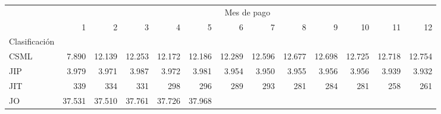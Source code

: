 \begin{tabular}{lllllllllllll}
\cline{1-13}
\multicolumn{1}{c}{} &
  \multicolumn{12}{|c}{Mes de pago} \\
\multicolumn{1}{c}{} &
  \multicolumn{1}{|r}{1} &
  \multicolumn{1}{r}{2} &
  \multicolumn{1}{r}{3} &
  \multicolumn{1}{r}{4} &
  \multicolumn{1}{r}{5} &
  \multicolumn{1}{r}{6} &
  \multicolumn{1}{r}{7} &
  \multicolumn{1}{r}{8} &
  \multicolumn{1}{r}{9} &
  \multicolumn{1}{r}{10} &
  \multicolumn{1}{r}{11} &
  \multicolumn{1}{r}{12} \\
\cline{1-13}
\multicolumn{1}{l}{Clasificación} &
  \multicolumn{1}{|r}{} &
  \multicolumn{1}{r}{} &
  \multicolumn{1}{r}{} &
  \multicolumn{1}{r}{} &
  \multicolumn{1}{r}{} &
  \multicolumn{1}{r}{} &
  \multicolumn{1}{r}{} &
  \multicolumn{1}{r}{} &
  \multicolumn{1}{r}{} &
  \multicolumn{1}{r}{} &
  \multicolumn{1}{r}{} &
  \multicolumn{1}{r}{} \\
\multicolumn{1}{l}{\hspace{1em}CSML} &
  \multicolumn{1}{|r}{7.890} &
  \multicolumn{1}{r}{12.139} &
  \multicolumn{1}{r}{12.253} &
  \multicolumn{1}{r}{12.172} &
  \multicolumn{1}{r}{12.186} &
  \multicolumn{1}{r}{12.289} &
  \multicolumn{1}{r}{12.596} &
  \multicolumn{1}{r}{12.677} &
  \multicolumn{1}{r}{12.698} &
  \multicolumn{1}{r}{12.725} &
  \multicolumn{1}{r}{12.718} &
  \multicolumn{1}{r}{12.754} \\
\multicolumn{1}{l}{\hspace{1em}JIP} &
  \multicolumn{1}{|r}{3.979} &
  \multicolumn{1}{r}{3.971} &
  \multicolumn{1}{r}{3.987} &
  \multicolumn{1}{r}{3.972} &
  \multicolumn{1}{r}{3.981} &
  \multicolumn{1}{r}{3.954} &
  \multicolumn{1}{r}{3.950} &
  \multicolumn{1}{r}{3.955} &
  \multicolumn{1}{r}{3.956} &
  \multicolumn{1}{r}{3.956} &
  \multicolumn{1}{r}{3.939} &
  \multicolumn{1}{r}{3.932} \\
\multicolumn{1}{l}{\hspace{1em}JIT} &
  \multicolumn{1}{|r}{339} &
  \multicolumn{1}{r}{334} &
  \multicolumn{1}{r}{331} &
  \multicolumn{1}{r}{298} &
  \multicolumn{1}{r}{296} &
  \multicolumn{1}{r}{289} &
  \multicolumn{1}{r}{293} &
  \multicolumn{1}{r}{281} &
  \multicolumn{1}{r}{284} &
  \multicolumn{1}{r}{281} &
  \multicolumn{1}{r}{258} &
  \multicolumn{1}{r}{261} \\
\multicolumn{1}{l}{\hspace{1em}JO} &
  \multicolumn{1}{|r}{37.531} &
  \multicolumn{1}{r}{37.510} &
  \multicolumn{1}{r}{37.761} &
  \multicolumn{1}{r}{37.726} &
  \multicolumn{1}{r}{37.968} &

\end{tabular}
